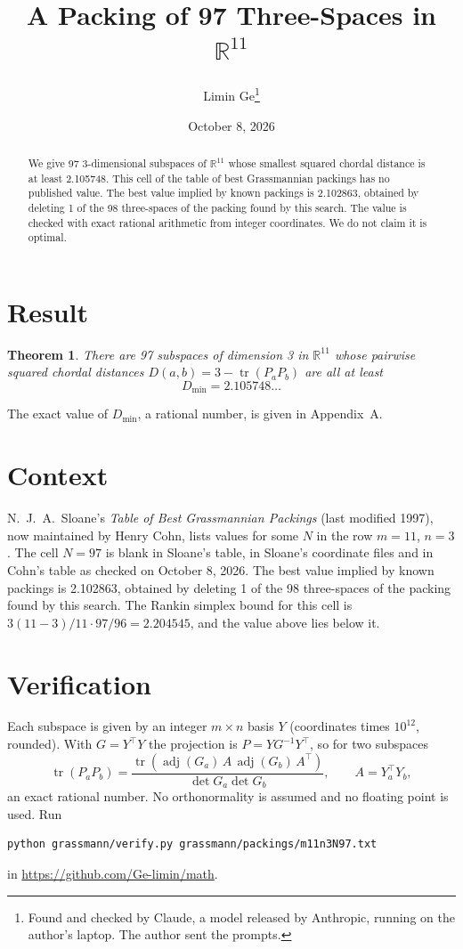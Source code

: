 \documentclass[11pt,a4paper]{article}
\title{A Packing of 97 Three-Spaces in $\mathbb{R}^{11}$}
\author{Limin Ge\thanks{Found and checked by Claude, a model released by Anthropic, running on the author's laptop. The author sent the prompts.}}
\date{October 8, 2026}
\newtheorem*{theorem}{Theorem}
\begin{document}
\maketitle
\begin{abstract}
We give 97 3-dimensional subspaces of $\mathbb{R}^{11}$ whose smallest squared chordal distance is at least 2.105748. This cell of the table of best Grassmannian packings has no published value. The best value implied by known packings is 2.102863, obtained by deleting 1 of the 98 three-spaces of the packing found by this search. The value is checked with exact rational arithmetic from integer coordinates. We do not claim it is optimal.
\end{abstract}

\section{Result}
\begin{theorem}
There are 97 subspaces of dimension 3 in $\mathbb{R}^{11}$ whose pairwise squared chordal distances $D(a,b) = 3 - \operatorname{tr}(P_aP_b)$ are all at least
\[ D_{\min} = 2.105748\ldots \]
\end{theorem}
The exact value of $D_{\min}$, a rational number, is given in Appendix~A.


\section{Context}
N.~J.~A.~Sloane's \emph{Table of Best Grassmannian Packings} (last modified 1997), now maintained by Henry Cohn, lists values for some $N$ in the row $m=11$, $n=3$. The cell $N=97$ is blank in Sloane's table, in Sloane's coordinate files and in Cohn's table as checked on October 8, 2026. The best value implied by known packings is 2.102863, obtained by deleting 1 of the 98 three-spaces of the packing found by this search. The Rankin simplex bound for this cell is $3(11-3)/11\cdot 97/96 = 2.204545$, and the value above lies below it.


\section{Verification}
Each subspace is given by an integer $m\times n$ basis $Y$ (coordinates times $10^{12}$, rounded). With $G=Y^\top Y$ the projection is $P=YG^{-1}Y^\top$, so for two subspaces
\[ \operatorname{tr}(P_aP_b)=\frac{\operatorname{tr}(\operatorname{adj}(G_a)\,A\,\operatorname{adj}(G_b)\,A^\top)}{\det G_a\det G_b},\qquad A=Y_a^\top Y_b, \]
an exact rational number. No orthonormality is assumed and no floating point is used. Run
\begin{verbatim}
python grassmann/verify.py grassmann/packings/m11n3N97.txt
\end{verbatim}
in \url{https://github.com/Ge-limin/math}.
\end{document}
